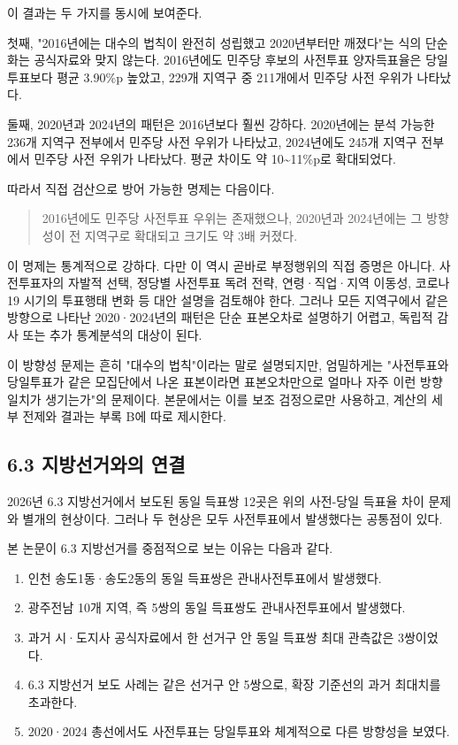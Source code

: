 \documentclass[preprint]{IEIE}
\begin{document}
이 결과는 두 가지를 동시에 보여준다.

첫째, "2016년에는 대수의 법칙이 완전히 성립했고 2020년부터만 깨졌다"는 식의 단순화는 공식자료와 맞지 않는다. 2016년에도 민주당 후보의 사전투표 양자득표율은 당일투표보다 평균 3.90\%p 높았고, 229개 지역구 중 211개에서 민주당 사전 우위가 나타났다.

둘째, 2020년과 2024년의 패턴은 2016년보다 훨씬 강하다. 2020년에는 분석 가능한 236개 지역구 전부에서 민주당 사전 우위가 나타났고, 2024년에도 245개 지역구 전부에서 민주당 사전 우위가 나타났다. 평균 차이도 약 10\textasciitilde{}11\%p로 확대되었다.

따라서 직접 검산으로 방어 가능한 명제는 다음이다.

\begin{quote}
2016년에도 민주당 사전투표 우위는 존재했으나, 2020년과 2024년에는 그 방향성이 전 지역구로 확대되고 크기도 약 3배 커졌다.
\end{quote}

이 명제는 통계적으로 강하다. 다만 이 역시 곧바로 부정행위의 직접 증명은 아니다. 사전투표자의 자발적 선택, 정당별 사전투표 독려 전략, 연령·직업·지역 이동성, 코로나19 시기의 투표행태 변화 등 대안 설명을 검토해야 한다. 그러나 모든 지역구에서 같은 방향으로 나타난 2020·2024년의 패턴은 단순 표본오차로 설명하기 어렵고, 독립적 감사 또는 추가 통계분석의 대상이 된다.

이 방향성 문제는 흔히 "대수의 법칙"이라는 말로 설명되지만, 엄밀하게는 "사전투표와 당일투표가 같은 모집단에서 나온 표본이라면 표본오차만으로 얼마나 자주 이런 방향 일치가 생기는가"의 문제이다. 본문에서는 이를 보조 검정으로만 사용하고, 계산의 세부 전제와 결과는 부록 B에 따로 제시한다.

\subsection{6.3 지방선거와의 연결}

2026년 6.3 지방선거에서 보도된 동일 득표쌍 12곳은 위의 사전-당일 득표율 차이 문제와 별개의 현상이다. 그러나 두 현상은 모두 사전투표에서 발생했다는 공통점이 있다.

본 논문이 6.3 지방선거를 중점적으로 보는 이유는 다음과 같다.

\begin{enumerate}
\item 인천 송도1동·송도2동의 동일 득표쌍은 관내사전투표에서 발생했다.
\item 광주전남 10개 지역, 즉 5쌍의 동일 득표쌍도 관내사전투표에서 발생했다.
\item 과거 시·도지사 공식자료에서 한 선거구 안 동일 득표쌍 최대 관측값은 3쌍이었다.
\item 6.3 지방선거 보도 사례는 같은 선거구 안 5쌍으로, 확장 기준선의 과거 최대치를 초과한다.
\item 2020·2024 총선에서도 사전투표는 당일투표와 체계적으로 다른 방향성을 보였다.
\end{enumerate}
\end{document}
